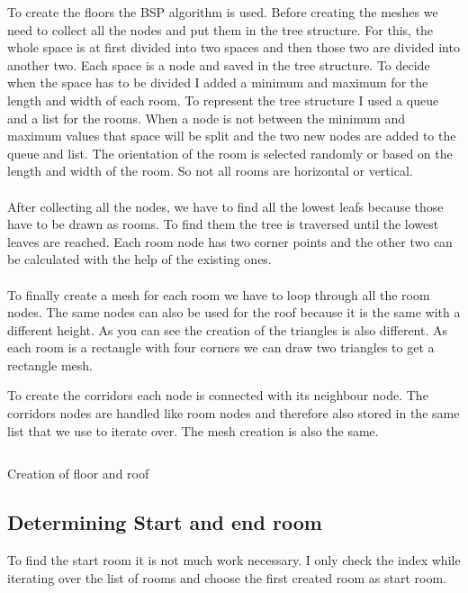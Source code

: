 \documentclass[a4paper,11pt,oneside]{scrreprt}
\begin{document}
To create the floors the BSP algorithm is used. Before creating the meshes we need to collect all the nodes and put them in the tree structure. For this, the whole space is at first divided into two spaces and then those two are divided into another two. Each space is a node and saved in the tree structure. To decide when the space has to be divided I added a minimum and maximum for the length and width of each room. To represent the tree structure I used a queue and a list for the rooms. When a node is not between the minimum and maximum values that space will be split and the two new nodes are added to the queue and list. The orientation of the room is selected randomly or based on the length and width of the room. So not all rooms are horizontal or vertical.
\\
\\
After collecting all the nodes, we have to find all the lowest leafs because those have to be drawn as rooms. To find them the tree is traversed until the lowest leaves are reached. Each room node has two corner points and the other two can be calculated with the help of the existing ones. 
\\
\\
To finally create a mesh for each room we have to loop through all the room nodes. The same nodes can also be used for the roof because it is the same with a different height. As you can see the creation of the triangles is also different. As each room is a rectangle with four corners we can draw two triangles to get a rectangle mesh.

To create the corridors each node is connected with its neighbour node. The corridors nodes are handled like room nodes and therefore also stored in the same list that we use to iterate over. The mesh creation is also the same.

\begin{listing}[ht]
    \inputminted[fontsize=\footnotesize,linenos]{csharp}{code/CreateFloorRoof.cs}
    \caption[Creation of floor and roof]{Creation of floor and roof}
    \label{code:creation-of-floor-and-roof}
\end{listing}

\newpage
\subsection{Determining Start and end room}
\label{subsection:determining-start-and-end-room}
To find the start room it is not much work necessary. I only check the index while iterating over the list of rooms and choose the first created room as start room. 
\end{document}
